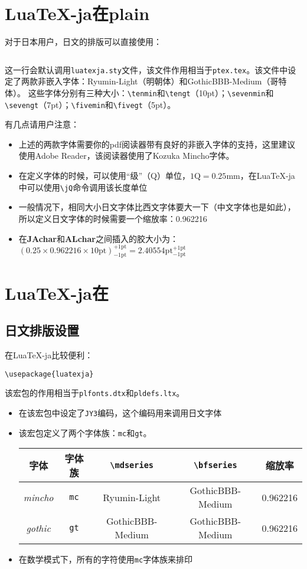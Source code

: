 \documentclass{ltjarticle}
\def\LuaTeX{Lua\TeX}
\def\pTeX{p\TeX}
\def\pLaTeX{p\LaTeX}
\begin{document}
\section{\LuaTeX-ja在plain }
对于日本用户，日文的排版可以直接使用：
\begin{verbatim}

\end{verbatim}

这一行会默认调用\verb!luatexja.sty!文件，该文件作用相当于\verb!ptex.tex!。该文件中设定了两款非嵌入字体：Ryumin-Light（明朝体）和GothicBBB-Medium（哥特体）。
这些字体分别有三种大小：\verb!\tenmin!和\verb!\tengt!（10pt）；\verb!\sevenmin!和\verb!\sevengt!（7pt）；\verb!\fivemin!和\verb!\fivegt!（5pt）。

有几点请用户注意：
\begin{itemize}
\item 上述的两款字体需要你的pdf阅读器带有良好的非嵌入字体的支持，这里建议使用Adobe Reader，该阅读器使用了Kozuka Mincho字体。
\item 在定义字体的时候，可以使用“级”（Q）单位，$1 \mathrm{Q} = 0.25\mathrm{mm}$，在\LuaTeX-ja中可以使用\verb!\jQ!命令调用该长度单位
\item 一般情况下，相同大小日文字体比西文字体要大一下（中文字体也是如此），所以定义日文字体的时候需要一个缩放率：0.962216
\item 在\textbf{JAchar}和\textbf{ALchar}之间插入的胶大小为：$(0.25\times0.962216\times\mathrm{10pt})^{\mathrm{+1pt}}_{\mathrm{-1pt}} = 2.40554\mathrm{pt}^{\mathrm{+1pt}}_{\mathrm{-1pt}}$
\end{itemize}
\section{\LuaTeX-ja在}
\subsection{日文排版设置}
在\LuaTeX-ja比较便利：
\begin{verbatim}
\usepackage{luatexja}
\end{verbatim}

该宏包的作用相当于\verb!plfonts.dtx!和\verb!pldefs.ltx!。
\begin{itemize}
\item 在该宏包中设定了\verb!JY3!编码，这个编码用来调用日文字体
\item 该宏包定义了两个字体族：\verb!mc!和\verb!gt!。\\
\begin{center}
	\begin{tabular}{ccccc}
	\hline
	字体&字体族&\verb!\mdseries!&\verb!\bfseries!&缩放率\\
	\hline
	\textit{mincho}&\verb!mc!&Ryumin-Light&GothicBBB-Medium&0.962216\\
	\textit{gothic}&\verb!gt!&GothicBBB-Medium&GothicBBB-Medium&0.962216\\
	\hline
	\end{tabular}
\end{center}
\item 在数学模式下，所有的字符使用\verb!mc!字体族来排印
\end{itemize}
\end{document}
